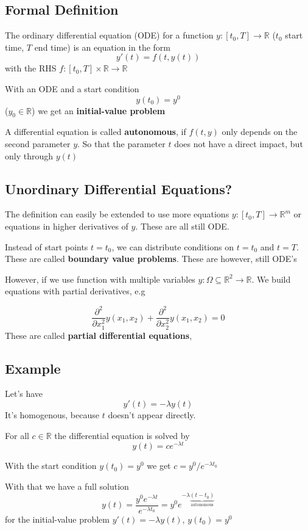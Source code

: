 \documentclass{article}
\begin{document}
\subsection{Formal Definition}
The ordinary differential equation (ODE) for a function $y:[t_0,T] \to \mathbb{R}$ ($t_0$ start time, $T$ end time) is an equation in the form
\[y'(t) = f(t,y(t))\]
with the RHS $f:[t_0,T]\times \mathbb{R}\to\mathbb{R}$

With an ODE and a start condition
\[y(t_0) = y^0\]
($y_0\in\mathbb{R}$) we get an \textbf{initial-value problem}

A differential equation is called \textbf{autonomous}, if $f(t,y)$ only depends on the second parameter $y$. So that the parameter $t$ does not have a direct impact, but only through $y(t)$

\subsection{Unordinary Differential Equations?}
The definition can easily be extended to use more equations $y:[t_0,T] \to \mathbb{R}^m$ or equations in higher derivatives of $y$. These are all still ODE.

Instead of start points $t=t_0$, we can distribute conditions on $t=t_0$ and $t=T$. These are called \textbf{boundary value problems}. These are however, still ODE's

However, if we use function with multiple variables $y:\Omega \subseteq \mathbb{R}^2 \to \mathbb{R}$. We build equations with partial derivatives, e.g

\[\frac{\partial^2}{\partial x_1^2}y(x_1,x_2) + \frac{\partial^2}{\partial x_2^2}y(x_1,x_2) = 0\]
These are called \textbf{partial differential equations}, 

\subsection{Example}
Let's have
\[y'(t) = -\lambda y(t)\]
It's homogenous, because $t$ doesn't appear directly.

For all $c\in\mathbb{R}$ the differential equation is solved by
\[y(t) = ce^{-\lambda t}\]


With the start condition $y(t_0) = y^0$ we get $c = y^0 /e^{-\lambda t_0}$

With that we have a full solution
\[y(t) = \frac{y^0e^{-\lambda t}}{e^{-\lambda t_0}} = y^0 e^{-\lambda \underbrace{(t-t_0)}_{\text{autonomous}}}\]
for the initial-value problem $y'(t) = -\lambda y(t)$, $y(t_0) = y^0$
\end{document}
